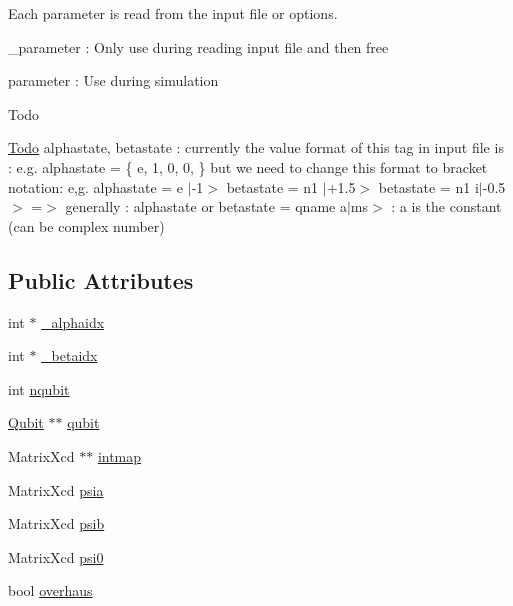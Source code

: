 Each parameter is read from the input file or options.
\begin{DoxyItemize}
\item \-\_\-parameter \-: Only use during reading input file and then free
\item parameter \-: Use during simulation \begin{DoxyRefDesc}{Todo}
\item[\hyperlink{todo__todo000014}{Todo}]alphastate, betastate \-: currently the value format of this tag in input file is \-: e.\-g. alphastate = \{ e, 1, 0, 0, \} but we need to change this format to bracket notation\-: e,g. alphastate = e $|$-\/1$>$ betastate = n1 $|$+1.5$>$ betastate = n1 i$|$-\/0.5$>$ =$>$ generally \-: alphastate or betastate = qname a$|$ms$>$ \-: a is the constant (can be complex number) \end{DoxyRefDesc}

\end{DoxyItemize}\subsection*{Public Attributes}
\begin{DoxyCompactItemize}
\item 
int $\ast$ \hyperlink{structQubitArray_a0a5c3875737d2a3bc14399109e89c82d}{\-\_\-alphaidx}
\item 
int $\ast$ \hyperlink{structQubitArray_a93fa20887ef373b3710d0734e9f1b7a4}{\-\_\-betaidx}
\item 
int \hyperlink{structQubitArray_ac87a8cdf149336447fe601f59c7ff371}{nqubit}
\item 
\hyperlink{structQubit}{Qubit} $\ast$$\ast$ \hyperlink{structQubitArray_ae87046f60e524d2aed1f6605c746d86e}{qubit}
\item 
Matrix\-Xcd $\ast$$\ast$ \hyperlink{structQubitArray_a1d74d3f22fe851f267c72b8cda416dd0}{intmap}
\item 
Matrix\-Xcd \hyperlink{structQubitArray_a168f33429921f2605e8c3ab850d3e6d9}{psia}
\item 
Matrix\-Xcd \hyperlink{structQubitArray_ad88cb397f3656eb7ac316e966d5e9172}{psib}
\item 
Matrix\-Xcd \hyperlink{structQubitArray_a17543dd30e2e5ef672ff5f751119beea}{psi0}
\item 
bool \hyperlink{structQubitArray_ab1cb38fcd5640338fad8c2abc868b53e}{overhaus}
\end{DoxyCompactItemize}


